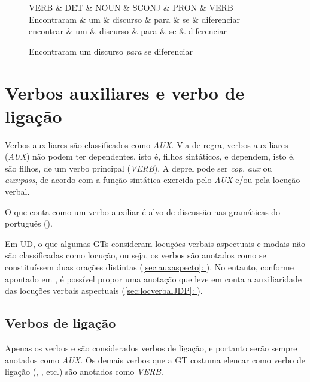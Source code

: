 \documentclass[output=paper,colorlinks,citecolor=brown]{langscibook}
\newcommand*{\fullref}[1]{\hyperref[{#1}]{\autoref*{#1}: \nameref*{#1}}} %
\begin{document}
		\begin{figure}[htbp]
					\centering
					\vspace{.8cm}
					\begin{dependency}
						\begin{deptext}
							VERB \& DET \& NOUN \& SCONJ \& PRON \& VERB \\
							Encontraram \& um \& discurso \& para \& se \& diferenciar \\
							encontrar \& um \& discurso \& para \& se \& diferenciar \\
						\end{deptext}
					\end{dependency}\label{dep:classesdinamicas}
					\caption{Encontraram um discurso \emph{para} se diferenciar}
				\end{figure}


\section{Verbos auxiliares e verbo de ligação}\label{sec:verbosauxiliares}

	Verbos auxiliares são classificados como \emph{AUX}. Via de regra, verbos auxiliares (\emph{AUX}) não podem ter dependentes, isto é, filhos sintáticos, e dependem, isto é, são filhos, de um verbo principal (\emph{VERB}). A deprel pode ser \emph{cop}, \emph{aux} ou \emph{aux:pass}, de acordo com a função sintática exercida pelo \emph{AUX} e/ou pela locução verbal.

	O que conta como um verbo auxiliar é alvo de discussão nas gramáticas do português (\citet{elvis2019locverbal}).

	Em UD, o que algumas GTs consideram locuções verbais aspectuais e modais não são classificadas como locução, ou seja, os verbos são anotados como se constituíssem duas orações distintas (\fullref{sec:auxaspecto}). No entanto, conforme apontado em \citet{elvis2019locverbal}, é possível propor uma anotação que leve em conta a auxiliaridade das locuções verbais aspectuais (\fullref{sec:locverbalJDP}).

	\subsection{Verbos de ligação}\label{sec:verbosdeligacao}
	
		Apenas os verbos  e  são considerados verbos de ligação, e portanto serão sempre anotados como \textit{AUX}. Os demais verbos que a GT costuma elencar como verbo de ligação (, , etc.) são anotados como \textit{VERB}.
\end{document}
